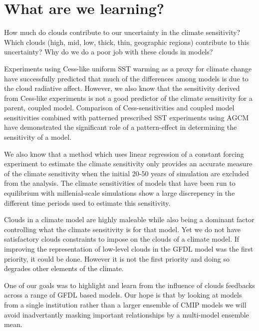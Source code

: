 \documentclass[11pt]{article}   	%
\begin{document}
\section{What are we learning?}

How much do clouds contribute to our uncertainty in the climate sensitivity?  
Which clouds (high, mid, low, thick, thin, geographic regions) contribute to this uncertainty?
Why do we do a poor job with these clouds in models?  

Experiments using Cess-like uniform SST warming as a proxy for climate change have successfully predicted that much of the differences 
among models is due to the cloud radiative affect.  However, we also know that the sensitivity derived from Cess-like experiments is not
a good predictor of the climate sensitivity for a parent, coupled model.  Comparison of Cess-sensitivities and coupled model sensitivities 
combined with patterned prescribed SST experiments using AGCM have demonstrated the significant role of a pattern-effect in determining 
the sensitivity of a model.  

We also know that a method which uses linear regression of a constant forcing experiment to estimate the climate sensitivity only 
provides an accurate measure of the climate sensitivity when the initial 20-50 years of simulation are excluded from the analysis.  
The climate sensitivities of models that have been run to equilibrium with millenial-scale simulations show a large discrepency in the
different time periods used to estimate this sensitivity.  

Clouds in a climate model are highly maleable while also being a dominant factor controlling what the climate sensitivity is for that model.  
Yet we do not have satisfactory clouds constraints to impose on the clouds of a climate model.  If improving the representation of low-level
clouds in the GFDL model was the first priority, it could be done.  However it is not the first priority and doing so degrades other elements of 
the climate.  

One of our goals was to highlight and learn from the influence of clouds feedbacks across a range of GFDL based models.  Our hope 
is that by looking at models from a single institution rather than a larger ensemble of CMIP models we will avoid inadvertantly 
masking important relationships by a multi-model ensemble mean.  
\end{document}
